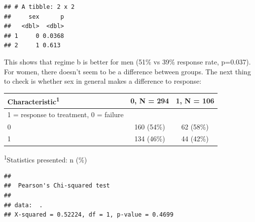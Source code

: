 \documentclass[]{book}
\newenvironment{Shaded}{\begin{snugshade}}{\end{snugshade}}
\newcommand{\DataTypeTok}[1]{\textcolor[rgb]{0.13,0.29,0.53}{#1}}
\newcommand{\KeywordTok}[1]{\textcolor[rgb]{0.13,0.29,0.53}{\textbf{#1}}}
\newcommand{\NormalTok}[1]{#1}
\newcommand{\OperatorTok}[1]{\textcolor[rgb]{0.81,0.36,0.00}{\textbf{#1}}}
\newcommand{\OtherTok}[1]{\textcolor[rgb]{0.56,0.35,0.01}{#1}}
\newcommand{\StringTok}[1]{\textcolor[rgb]{0.31,0.60,0.02}{#1}}
\begin{document}
\begin{verbatim}
## # A tibble: 2 x 2
##     sex      p
##   <dbl>  <dbl>
## 1     0 0.0368
## 2     1 0.613
\end{verbatim}

This shows that regime b is better for men (51\% vs 39\% response rate, p=0.037). For women, there doesn't seem to be a difference between groups. The next thing to check is whether sex in general makes a difference to response:

\begin{Shaded}
\end{Shaded}

\captionsetup[table]{labelformat=empty,skip=1pt}
\begin{longtable}{lcc}
\toprule
\textbf{Characteristic}\textsuperscript{1} & \textbf{0}, N = 294 & \textbf{1}, N = 106 \\ 
\midrule
1 = response to treatment, 0 = failure &  &  \\ 
0 & 160 (54\%) & 62 (58\%) \\ 
1 & 134 (46\%) & 44 (42\%) \\ 
\bottomrule
\end{longtable}
\vspace{-5mm}
\begin{minipage}{\linewidth}
\textsuperscript{1}Statistics presented: n (\%) \\ 
\end{minipage}

\begin{Shaded}
\end{Shaded}

\begin{verbatim}
## 
##  Pearson's Chi-squared test
## 
## data:  .
## X-squared = 0.52224, df = 1, p-value = 0.4699
\end{verbatim}
\end{document}
